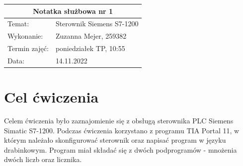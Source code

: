 \documentclass[12pt]{article}
\begin{document}
\begin{table}[H]
    \centering
    \renewcommand{\arraystretch}{1.5}
    \begin{tabularx}{\textwidth}{|X|X|}
    \hline
    \multicolumn{2}{|c|}{\large\textbf{Notatka służbowa nr 1}} \\ \hline
    Temat:          & Sterownik Siemens S7-1200    \\ \hline
    Wykonanie:      & Zuzanna Mejer, 259382   \\ \hline
    Termin zajęć:   & poniedziałek TP, 10:55  \\ \hline  
    Data:           & 14.11.2022    \\ \hline
    \end{tabularx}
    \end{table}

\section{Cel ćwiczenia}
Celem ćwiczenia było zaznajomienie się z obsługą sterownika PLC Siemens Simatic S7-1200. Podczas ćwiczenia korzystano z programu TIA Portal 11, w którym należało skonfigurować sterownik oraz napisać program w języku drabinkowym. Program miał składać się z dwóch podprogramów - mnożenia dwóch liczb oraz licznika. 
\end{document}
